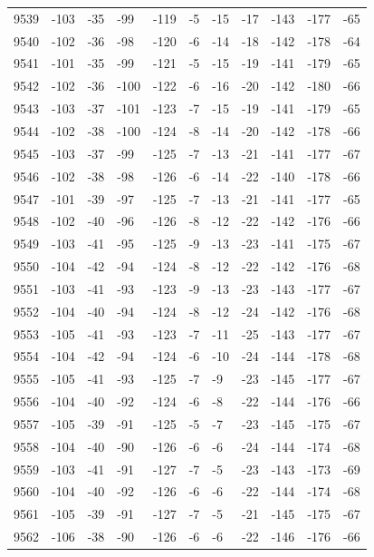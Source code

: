 \begin{table}[H]
\begin{tabular}{lllllllllll}
9539 & -103 & -35 & -99 & -119 & -5 & -15 & -17 & -143 & -177 & -65 \\
9540 & -102 & -36 & -98 & -120 & -6 & -14 & -18 & -142 & -178 & -64 \\
9541 & -101 & -35 & -99 & -121 & -5 & -15 & -19 & -141 & -179 & -65 \\
9542 & -102 & -36 & -100 & -122 & -6 & -16 & -20 & -142 & -180 & -66 \\
9543 & -103 & -37 & -101 & -123 & -7 & -15 & -19 & -141 & -179 & -65 \\
9544 & -102 & -38 & -100 & -124 & -8 & -14 & -20 & -142 & -178 & -66 \\
9545 & -103 & -37 & -99 & -125 & -7 & -13 & -21 & -141 & -177 & -67 \\
9546 & -102 & -38 & -98 & -126 & -6 & -14 & -22 & -140 & -178 & -66 \\
9547 & -101 & -39 & -97 & -125 & -7 & -13 & -21 & -141 & -177 & -65 \\
9548 & -102 & -40 & -96 & -126 & -8 & -12 & -22 & -142 & -176 & -66 \\
9549 & -103 & -41 & -95 & -125 & -9 & -13 & -23 & -141 & -175 & -67 \\
9550 & -104 & -42 & -94 & -124 & -8 & -12 & -22 & -142 & -176 & -68 \\
9551 & -103 & -41 & -93 & -123 & -9 & -13 & -23 & -143 & -177 & -67 \\
9552 & -104 & -40 & -94 & -124 & -8 & -12 & -24 & -142 & -176 & -68 \\
9553 & -105 & -41 & -93 & -123 & -7 & -11 & -25 & -143 & -177 & -67 \\
9554 & -104 & -42 & -94 & -124 & -6 & -10 & -24 & -144 & -178 & -68 \\
9555 & -105 & -41 & -93 & -125 & -7 & -9 & -23 & -145 & -177 & -67 \\
9556 & -104 & -40 & -92 & -124 & -6 & -8 & -22 & -144 & -176 & -66 \\
9557 & -105 & -39 & -91 & -125 & -5 & -7 & -23 & -145 & -175 & -67 \\
9558 & -104 & -40 & -90 & -126 & -6 & -6 & -24 & -144 & -174 & -68 \\
9559 & -103 & -41 & -91 & -127 & -7 & -5 & -23 & -143 & -173 & -69 \\
9560 & -104 & -40 & -92 & -126 & -6 & -6 & -22 & -144 & -174 & -68 \\
9561 & -105 & -39 & -91 & -127 & -7 & -5 & -21 & -145 & -175 & -67 \\
9562 & -106 & -38 & -90 & -126 & -6 & -6 & -22 & -146 & -176 & -66 \\

\end{tabular}
\end{table}
